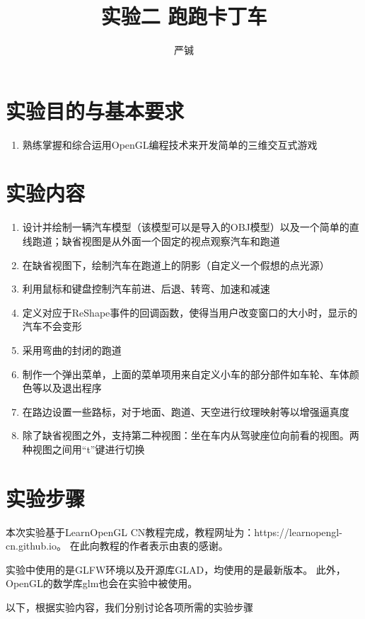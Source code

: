 \documentclass[UTF8]{ctexart}
\title{实验二 \quad 跑跑卡丁车 }
\date{}
\author{严铖 \quad 517021910823}
\begin{document}
\maketitle

\section{实验目的与基本要求}
\begin{enumerate}
	\item 熟练掌握和综合运用OpenGL编程技术来开发简单的三维交互式游戏
\end{enumerate}

\section{实验内容}
\begin{enumerate}
    \item 设计并绘制一辆汽车模型（该模型可以是导入的OBJ模型）以及一个简单的直线跑道；缺省视图是从外面一个固定的视点观察汽车和跑道
    \item 在缺省视图下，绘制汽车在跑道上的阴影（自定义一个假想的点光源）
    \item 利用鼠标和键盘控制汽车前进、后退、转弯、加速和减速
    \item 定义对应于ReShape事件的回调函数，使得当用户改变窗口的大小时，显示的汽车不会变形	
    \item 采用弯曲的封闭的跑道
    \item 制作一个弹出菜单，上面的菜单项用来自定义小车的部分部件如车轮、车体颜色等以及退出程序
    \item 在路边设置一些路标，对于地面、跑道、天空进行纹理映射等以增强逼真度
    \item 除了缺省视图之外，支持第二种视图：坐在车内从驾驶座位向前看的视图。两种视图之间用“t”键进行切换
\end{enumerate}

\section{实验步骤}
\par
本次实验基于LearnOpenGL CN教程完成，教程网址为：https://learnopengl-cn.github.io。
在此向教程的作者表示由衷的感谢。
\par
实验中使用的是GLFW环境以及开源库GLAD，均使用的是最新版本。
此外，OpenGL的数学库glm也会在实验中被使用。
\par
以下，根据实验内容，我们分别讨论各项所需的实验步骤
\end{document}
